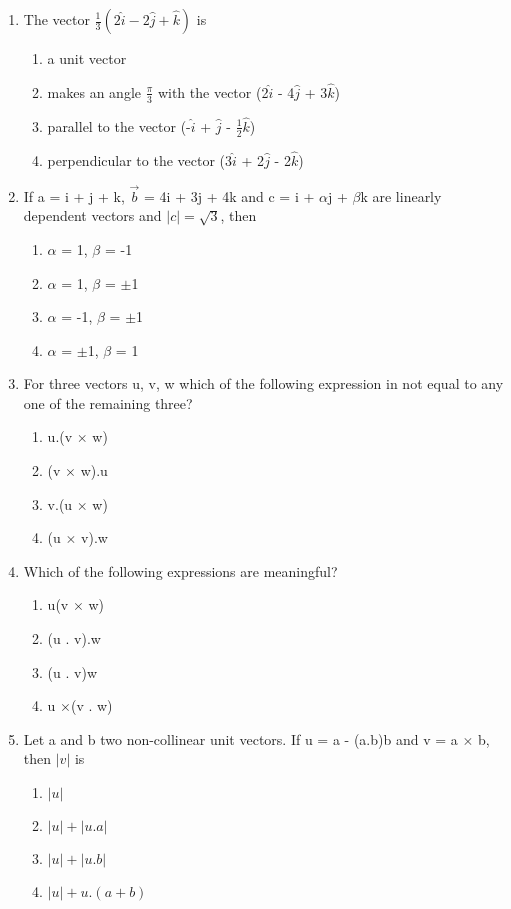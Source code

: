 \begin{enumerate}[label=\arabic*.,ref=\thesubsection.\theenumi]
\item The vector $\frac{1}{3}(2\hat{i} - 2\hat{j} + \hat{k})$ is
\begin{enumerate}
\item a unit vector
\item makes an angle $\frac{\pi}{3}$ with the vector (2$\hat{i}$ - 4$\hat{j}$ + 3$\hat{k}$)
\item parallel to the vector (-$\hat{i}$ + $\hat{j}$ - $\frac{1}{2}\hat{k}$)
\item perpendicular to the vector (3$\hat{i}$ + 2$\hat{j}$ - 2$\hat{k}$)
\end{enumerate}

\item If a = i + j + k, $\overrightarrow{b}$ = 4i + 3j + 4k and c = i + $\alpha$j + $\beta$k are linearly dependent vectors and $|c|=\sqrt{3}$, then
\begin{enumerate}
\item $\alpha$ = 1, $\beta$ = -1
\item $\alpha$ = 1, $\beta$ = $\pm$1
\item $\alpha$ = -1, $\beta$ = $\pm$1
\item $\alpha$ = $\pm$1, $\beta$ = 1
\end{enumerate}

\item For three vectors u, v, w which of the following expression in not equal to any one of the remaining three?
\begin{enumerate}
\item u.(v $\times$ w)
\item (v $\times$ w).u
\item v.(u $\times$ w)
\item (u $\times$ v).w
\end{enumerate}

\item Which of the following expressions are meaningful?
\begin{enumerate}
\item u(v $\times$ w)
\item (u . v).w
\item (u . v)w
\item u $\times$(v . w)
\end{enumerate}

\item Let a and b two non-collinear unit vectors. If u = a - (a.b)b and v = a $\times$ b, then $|v|$ is
\begin{enumerate}
\item $|u|$
\item $|u| + |u.a|$
\item $|u| + |u.b|$
\item $|u| + u.(a+b)$
\end{enumerate}


\end{enumerate}
